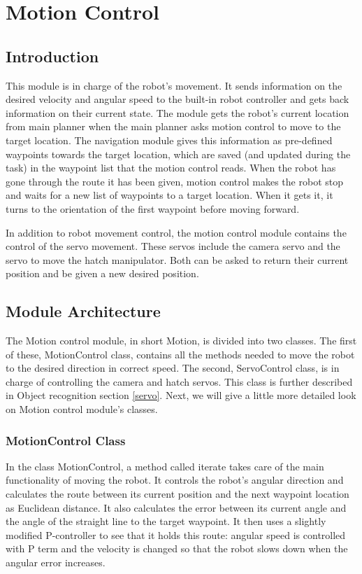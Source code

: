 \documentclass[a4paper,10pt]{article}
\begin{document}
\section{Motion Control}

\subsection{Introduction}

This module is in charge of the robot's movement. It sends information on the desired velocity and angular speed to the built-in robot controller and gets back information on their current state. The module gets the robot's current location from main planner when the main planner asks motion control to move to the target location. The navigation module gives this information as pre-defined waypoints towards the target location, which are saved (and updated during the task) in the waypoint list that the motion control reads. When the robot has gone through the route it has been given, motion control makes the robot stop and waits for a new list of waypoints to a target location. When it gets it, it turns to the orientation of the first waypoint before moving forward.

In addition to robot movement control, the motion control module contains the control of the servo movement. These servos include the camera servo and the servo to move the hatch manipulator. Both can be asked to return their current position and be given a new desired position. 

\subsection{Module Architecture}

The Motion control module, in short Motion, is divided into two classes. The first of these, MotionControl class, contains all the methods needed to move the robot to the desired direction in correct speed. The second, ServoControl class, is in charge of controlling the camera and hatch servos. This class is further described in Object recognition section \ref{servo}. Next, we will give a little more detailed look on Motion control module's classes.

\subsubsection{MotionControl Class}

In the class MotionControl, a method called iterate takes care of the main functionality of moving the robot. It controls the robot's angular direction and calculates the route between its current position and the next waypoint location as Euclidean distance. It also calculates the error between its current angle and the angle of the straight line to the target waypoint. It then uses a slightly modified P-controller to see that it holds this route: angular speed is controlled with P term and the velocity is changed so that the robot slows down when the angular error increases.
\end{document}
